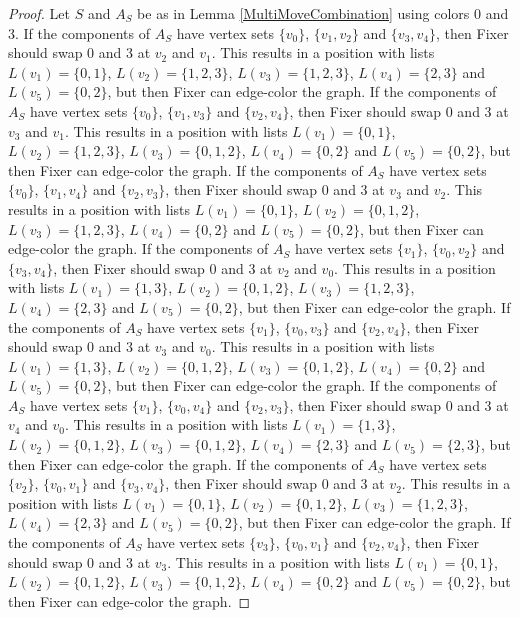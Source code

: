 \documentclass[12pt]{amsart}
\theoremstyle{plain}
\theoremstyle{definition}
\theoremstyle{remark}
\begin{document}
\begin{proof}
Let $S$ and $A_S$ be as in Lemma \ref{MultiMoveCombination} using colors $0$ and $3$. If the components of $A_S$ have vertex sets $\{v_0\}$, $\{v_1, v_2\}$ and $\{v_3, v_4\}$, then Fixer should swap 0 and 3 at $v_2$ and $v_1$. This results in a position with lists $L(v_1) = \{0, 1\}$, $L(v_2) = \{1, 2, 3\}$, $L(v_3) = \{1, 2, 3\}$, $L(v_4) = \{2, 3\}$ and $L(v_5) = \{0, 2\}$, but then Fixer can edge-color the graph.
If the components of $A_S$ have vertex sets $\{v_0\}$, $\{v_1, v_3\}$ and $\{v_2, v_4\}$, then Fixer should swap 0 and 3 at $v_3$ and $v_1$. This results in a position with lists $L(v_1) = \{0, 1\}$, $L(v_2) = \{1, 2, 3\}$, $L(v_3) = \{0, 1, 2\}$, $L(v_4) = \{0, 2\}$ and $L(v_5) = \{0, 2\}$, but then Fixer can edge-color the graph.
If the components of $A_S$ have vertex sets $\{v_0\}$, $\{v_1, v_4\}$ and $\{v_2, v_3\}$, then Fixer should swap 0 and 3 at $v_3$ and $v_2$. This results in a position with lists $L(v_1) = \{0, 1\}$, $L(v_2) = \{0, 1, 2\}$, $L(v_3) = \{1, 2, 3\}$, $L(v_4) = \{0, 2\}$ and $L(v_5) = \{0, 2\}$, but then Fixer can edge-color the graph.
If the components of $A_S$ have vertex sets $\{v_1\}$, $\{v_0, v_2\}$ and $\{v_3, v_4\}$, then Fixer should swap 0 and 3 at $v_2$ and $v_0$. This results in a position with lists $L(v_1) = \{1, 3\}$, $L(v_2) = \{0, 1, 2\}$, $L(v_3) = \{1, 2, 3\}$, $L(v_4) = \{2, 3\}$ and $L(v_5) = \{0, 2\}$, but then Fixer can edge-color the graph.
If the components of $A_S$ have vertex sets $\{v_1\}$, $\{v_0, v_3\}$ and $\{v_2, v_4\}$, then Fixer should swap 0 and 3 at $v_3$ and $v_0$. This results in a position with lists $L(v_1) = \{1, 3\}$, $L(v_2) = \{0, 1, 2\}$, $L(v_3) = \{0, 1, 2\}$, $L(v_4) = \{0, 2\}$ and $L(v_5) = \{0, 2\}$, but then Fixer can edge-color the graph.
If the components of $A_S$ have vertex sets $\{v_1\}$, $\{v_0, v_4\}$ and $\{v_2, v_3\}$, then Fixer should swap 0 and 3 at $v_4$ and $v_0$. This results in a position with lists $L(v_1) = \{1, 3\}$, $L(v_2) = \{0, 1, 2\}$, $L(v_3) = \{0, 1, 2\}$, $L(v_4) = \{2, 3\}$ and $L(v_5) = \{2, 3\}$, but then Fixer can edge-color the graph.
If the components of $A_S$ have vertex sets $\{v_2\}$, $\{v_0, v_1\}$ and $\{v_3, v_4\}$, then Fixer should swap 0 and 3 at $v_2$. This results in a position with lists $L(v_1) = \{0, 1\}$, $L(v_2) = \{0, 1, 2\}$, $L(v_3) = \{1, 2, 3\}$, $L(v_4) = \{2, 3\}$ and $L(v_5) = \{0, 2\}$, but then Fixer can edge-color the graph.
If the components of $A_S$ have vertex sets $\{v_3\}$, $\{v_0, v_1\}$ and $\{v_2, v_4\}$, then Fixer should swap 0 and 3 at $v_3$. This results in a position with lists $L(v_1) = \{0, 1\}$, $L(v_2) = \{0, 1, 2\}$, $L(v_3) = \{0, 1, 2\}$, $L(v_4) = \{0, 2\}$ and $L(v_5) = \{0, 2\}$, but then Fixer can edge-color the graph.

\end{proof}
\end{document}
